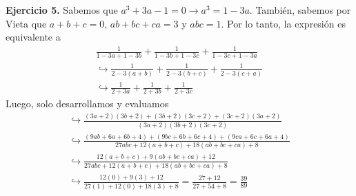     \textbf{Ejercicio 5.}
    Sabemos que $a^3 + 3a - 1 = 0 \rightarrow a^3 = 1 - 3a$.
    También, sabemos por Vieta que $a + b + c = 0$, $ab + bc + ca = 3$ y $abc = 1$.
    Por lo tanto, la expresión es equivalente a
    \begin{gather*}
        \frac{1}{1 - 3a + 1 - 3b} + \frac{1}{1 - 3b + 1 - 3c} + \frac{1}{1 - 3c + 1 - 3a}\\
        \hookrightarrow \frac{1}{2 - 3(a + b)} + \frac{1}{2 - 3(b + c)} + \frac{1}{2 - 3(c + a)}\\
        \hookrightarrow \frac{1}{2 + 3a} + \frac{1}{2 + 3b} + \frac{1}{2 + 3c}
    \end{gather*}
    Luego, solo desarrollamos y evaluamos
    \begin{gather*}
        \hookrightarrow \frac{(3a + 2)(3b + 2) + (3b + 2)(3c + 2) + (3c + 2)(3a + 2)}{(3a + 2)(3b + 2)(3c + 2)}\\
        \hookrightarrow \frac{(9ab + 6a + 6b + 4) + (9bc + 6b + 6c + 4) + (9ca + 6c + 6a + 4)}{27abc + 12(a + b + c) + 18(ab + bc + ca) + 8}\\
        \hookrightarrow \frac{ 12(a + b + c) + 9(ab + bc + ca) + 12}{27abc + 12(a + b + c) + 18(ab + bc + ca) + 8}\\
        \hookrightarrow \frac{ 12(0) + 9(3) + 12}{27(1) + 12(0) + 18(3) + 8} = \frac{27 + 12}{27 + 54 + 8}  = \boxed{\frac{39}{89}}
    \end{gather*}


